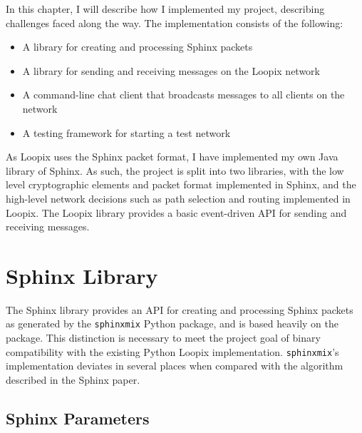 \documentclass[12pt,a4paper,twoside,openright]{report}
\begin{document}


In this chapter, I will describe how I implemented my project, describing challenges faced along the way. The implementation consists of the following:

\begin{itemize}
	\item A library for creating and processing Sphinx packets
	\item A library for sending and receiving messages on the Loopix network
	\item A command-line chat client that broadcasts messages to all clients on the network
	\item A testing framework for starting a test network
\end{itemize}

As Loopix uses the Sphinx packet format, I have implemented my own Java library of Sphinx. As such, the project is split into two libraries, with the low level cryptographic elements and packet format implemented in Sphinx, and the high-level network decisions such as path selection and routing implemented in Loopix. The Loopix library provides a basic event-driven API for sending and receiving messages.

\section{Sphinx Library}

The Sphinx library provides an API for creating and processing Sphinx packets as generated by the \verb|sphinxmix| Python package, and is based heavily on the package. This distinction is necessary to meet the project goal of binary compatibility with the existing Python Loopix implementation. \verb|sphinxmix|'s implementation deviates in several places when compared with the algorithm described in the Sphinx paper.

\subsection{Sphinx Parameters}
\end{document}

